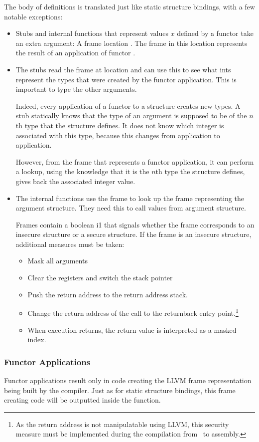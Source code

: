 The body of definitions is translated just like static structure bindings, with a few notable exceptions:
\begin{itemize}
\item Stubs and internal functions that represent values $x$ defined by a functor  take an extra argument: A frame location .
The frame  in this location represents the result of an application of functor .
\item The stubs read the frame  at location  and can use this to see what ints represent the types that were created by the functor application.
This is important to type the other arguments.

Indeed, every application of a functor to a structure creates new types. 
A stub statically knows that the type of an argument is supposed to be of the $n$th type that the structure defines. It does not know which integer is associated with this type, because this changes from application to application.

However, from the frame that represents a functor application, it can perform a lookup, using the knowledge that it is the $n$th type the structure defines, gives back the associated integer value.
\item The internal functions use the frame to look up the frame representing the argument structure.
They need this to call values from argument structure.

Frames contain a boolean i1 that signals whether the frame corresponds to an insecure structure or a secure structure.
If the frame is an insecure structure, additional measures must be taken:
\begin{itemize}
\item Mask all arguments
\item Clear the registers and switch the stack pointer
\item Push the return address to the return address stack.
\item Change the return address of the call to the returnback entry point.\footnote{As the return address is not manipulatable using LLVM, this security measure must be implemented during the compilation from \LLVMIR\ to assembly.}
\item When execution returns, the return value is interpreted as a masked index.
\end{itemize}
\end{itemize}

\subsubsection{Functor Applications}
Functor applications result only in code creating the LLVM frame representation being built by the compiler.
Just as for static structure bindings, this frame creating code will be outputted inside the  function.

